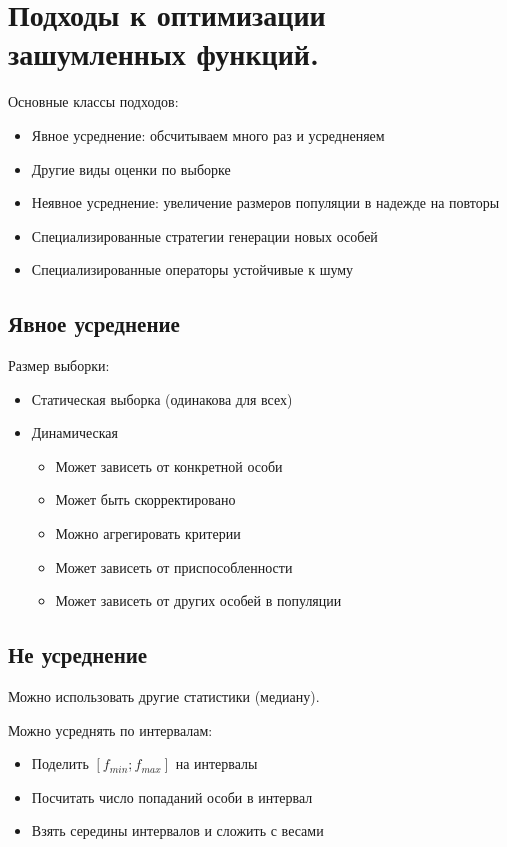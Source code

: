 \section{Подходы к оптимизации зашумленных функций.}

Основные классы подходов:
\begin{itemize}
    \item Явное усреднение: обсчитываем много раз и усредненяем
    \item Другие виды оценки по выборке
    \item Неявное усреднение: увеличение размеров популяции
    в надежде на повторы
    \item Специализированные стратегии генерации новых особей
    \item Специализированные операторы устойчивые к шуму
\end{itemize}

\subsection*{Явное усреднение}

Размер выборки:
\begin{itemize}
    \item Статическая выборка (одинакова для всех)
    \item Динамическая
    \begin{itemize}
        \item Может зависеть от конкретной особи
        \item Может быть скорректировано
        \item Можно агрегировать критерии
        \item Может зависеть от приспособленности
        \item Может зависеть от других особей в популяции
    \end{itemize}
\end{itemize}


\subsection*{Не усреднение}

Можно использовать другие статистики (медиану).

Можно усреднять по интервалам:
\begin{itemize}
    \item Поделить $[f_{min}; f_{max}]$ на интервалы
    \item Посчитать число попаданий особи в интервал
    \item Взять середины интервалов и сложить с весами
\end{itemize}

